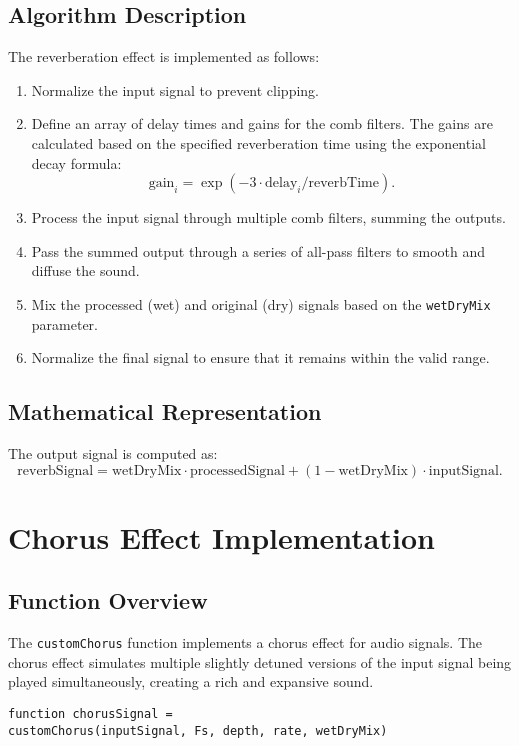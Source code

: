 \documentclass{article}
\begin{document}
\subsection{Algorithm Description}
The reverberation effect is implemented as follows:
\begin{enumerate}
    \item Normalize the input signal to prevent clipping.
    \item Define an array of delay times and gains for the comb filters. The gains are calculated based on the specified reverberation time using the exponential decay formula:
    \[
    \text{gain}_i = \exp\left(-3 \cdot \text{delay}_i / \text{reverbTime}\right).
    \]
    \item Process the input signal through multiple comb filters, summing the outputs.
    \item Pass the summed output through a series of all-pass filters to smooth and diffuse the sound.
    \item Mix the processed (wet) and original (dry) signals based on the \texttt{wetDryMix} parameter.
    \item Normalize the final signal to ensure that it remains within the valid range.
\end{enumerate}

\subsection{Mathematical Representation}
The output signal is computed as:
\[
\text{reverbSignal} = \text{wetDryMix} \cdot \text{processedSignal} + (1 - \text{wetDryMix}) \cdot \text{inputSignal}.
\]

\section{Chorus Effect Implementation}

\subsection{Function Overview}
The \texttt{customChorus} function implements a chorus effect for audio signals. The chorus effect simulates multiple slightly detuned versions of the input signal being played simultaneously, creating a rich and expansive sound.

\begin{verbatim}
function chorusSignal =
customChorus(inputSignal, Fs, depth, rate, wetDryMix)
\end{verbatim}
\end{document}

